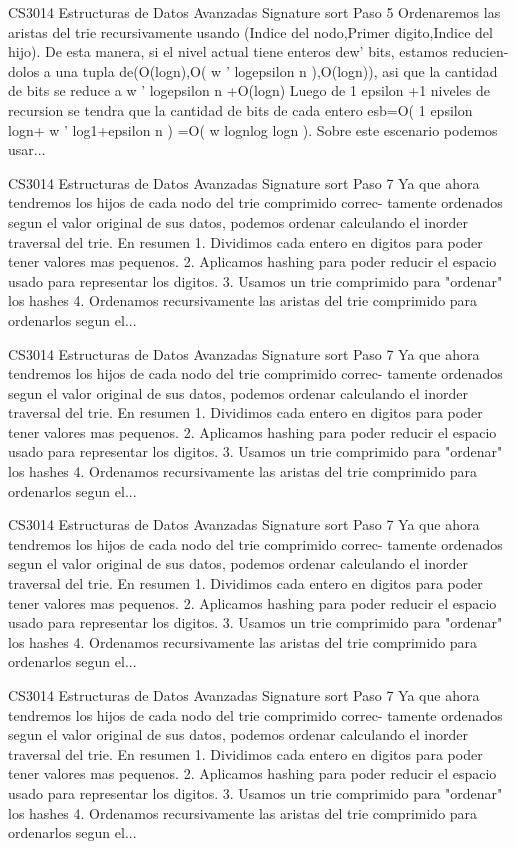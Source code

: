 \begin{description}[leftmargin=!,labelwidth=4.2em,style=nextline]
\item[Pag. 46] CS3014 Estructuras de Datos Avanzadas Signature sort Paso 5 Ordenaremos las aristas del trie recursivamente usando (Indice del nodo,Primer digito,Indice del hijo). De esta manera, si el nivel actual tiene enteros dew' bits, estamos reducien- dolos a una tupla de(O(logn),O( w ' logepsilon n ),O(logn)), asi que la cantidad de bits se reduce a w ' logepsilon n +O(logn) Luego de 1 epsilon +1 niveles de recursion se tendra que la cantidad de bits de cada entero esb=O( 1 epsilon logn+ w ' log1+epsilon n ) =O( w lognlog logn ). Sobre este escenario podemos usar...
\item[Pag. 47] CS3014 Estructuras de Datos Avanzadas Signature sort Paso 7 Ya que ahora tendremos los hijos de cada nodo del trie comprimido correc- tamente ordenados segun el valor original de sus datos, podemos ordenar calculando el inorder traversal del trie. En resumen 1. Dividimos cada entero en digitos para poder tener valores mas pequenos. 2. Aplicamos hashing para poder reducir el espacio usado para representar los digitos. 3. Usamos un trie comprimido para "ordenar" los hashes 4. Ordenamos recursivamente las aristas del trie comprimido para ordenarlos segun el...
\item[Pag. 48] CS3014 Estructuras de Datos Avanzadas Signature sort Paso 7 Ya que ahora tendremos los hijos de cada nodo del trie comprimido correc- tamente ordenados segun el valor original de sus datos, podemos ordenar calculando el inorder traversal del trie. En resumen 1. Dividimos cada entero en digitos para poder tener valores mas pequenos. 2. Aplicamos hashing para poder reducir el espacio usado para representar los digitos. 3. Usamos un trie comprimido para "ordenar" los hashes 4. Ordenamos recursivamente las aristas del trie comprimido para ordenarlos segun el...
\item[Pag. 49] CS3014 Estructuras de Datos Avanzadas Signature sort Paso 7 Ya que ahora tendremos los hijos de cada nodo del trie comprimido correc- tamente ordenados segun el valor original de sus datos, podemos ordenar calculando el inorder traversal del trie. En resumen 1. Dividimos cada entero en digitos para poder tener valores mas pequenos. 2. Aplicamos hashing para poder reducir el espacio usado para representar los digitos. 3. Usamos un trie comprimido para "ordenar" los hashes 4. Ordenamos recursivamente las aristas del trie comprimido para ordenarlos segun el...
\item[Pag. 50] CS3014 Estructuras de Datos Avanzadas Signature sort Paso 7 Ya que ahora tendremos los hijos de cada nodo del trie comprimido correc- tamente ordenados segun el valor original de sus datos, podemos ordenar calculando el inorder traversal del trie. En resumen 1. Dividimos cada entero en digitos para poder tener valores mas pequenos. 2. Aplicamos hashing para poder reducir el espacio usado para representar los digitos. 3. Usamos un trie comprimido para "ordenar" los hashes 4. Ordenamos recursivamente las aristas del trie comprimido para ordenarlos segun el...

\end{description}

